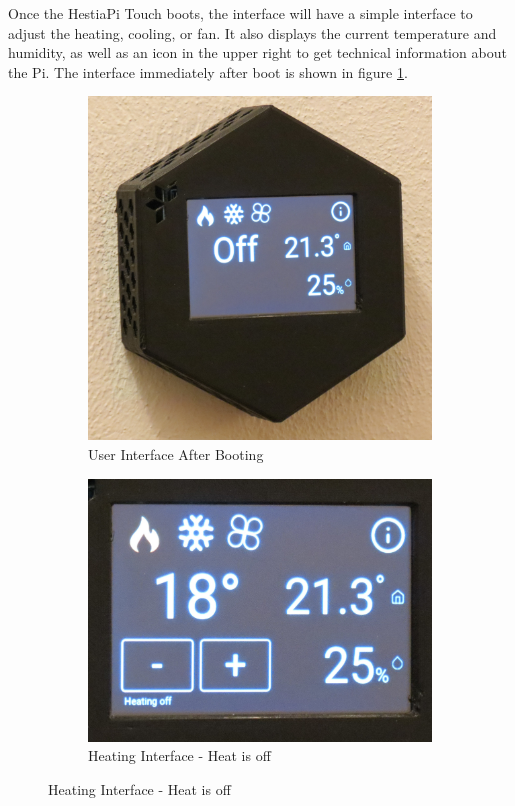 Once the HestiaPi Touch boots, the interface will have a simple interface to
adjust the heating, cooling, or fan.  It also displays the current temperature
and humidity, as well as an icon in the upper right to get technical
information about the Pi.  The interface immediately after boot is shown in
figure \ref{fig:ui}.

\begin{figure}
\centering
\begin{subfigure}{0.5\textwidth}
  \centering
  \includegraphics[width=.75\linewidth]{img/ui.jpg}
  \caption{User Interface After Booting}
  \label{fig:ui}
\end{subfigure}%
\begin{subfigure}{0.5\textwidth}
  \centering
  \includegraphics[width=.75\linewidth]{img/ui-heating-off.jpg}
  \caption{Heating Interface - Heat is off}
  \label{fig:ui-heating-off}
\end{subfigure}


\end{figure}
